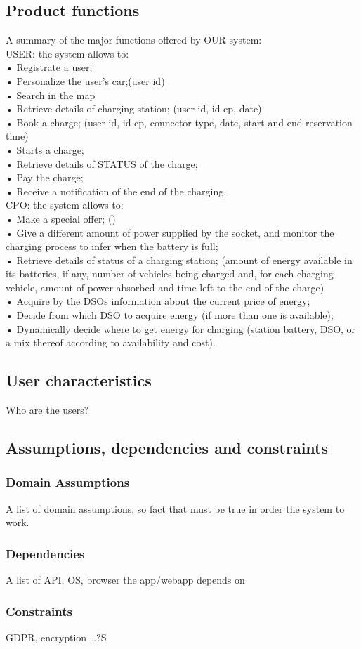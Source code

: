 \subsection{Product functions}
A summary of the major functions offered by OUR system:\\
USER: the system allows to:\\
• Registrate a user; \\
• Personalize the user's car;(user id)\\
• Search in the map\\
• Retrieve details of charging station; (user id, id cp, date)\\
• Book a charge; (user id, id cp, connector type, date, start and end reservation time)\\
• Starts a charge;\\
• Retrieve details of STATUS of the charge;\\
• Pay the charge;\\
• Receive a notification of the end of the charging.\\
CPO: the system allows to:\\
• Make a special offer; ()\\
• Give a different amount of power supplied by the socket, and monitor
the charging process to infer when the battery is full;\\
• Retrieve details of status of a charging station; (amount of energy available 
in its batteries, if any, number of vehicles being charged and, for each charging 
vehicle, amount of power absorbed and time left to the end of the charge)\\
• Acquire by the DSOs information about the current price of energy;\\
• Decide from which DSO to acquire energy (if more than one is available);\\
• Dynamically decide where to get energy for charging (station battery, DSO, or a mix thereof
according to availability and cost).\\


\subsection{User characteristics}
Who are the users?

\subsection{Assumptions, dependencies and constraints}
\subsubsection*{Domain Assumptions}
A list of domain assumptions, so fact that must be true in order the system to work.
\subsubsection*{Dependencies}
A list of API, OS, browser the app/webapp depends on
\subsubsection*{Constraints}
GDPR, encryption \dots?S
